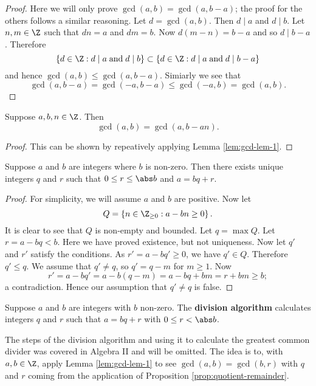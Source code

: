 \begin{proof}
	Here we will only prove $\gcd(a, b) = \gcd(a, b - a)$;
	the proof for the others follows a similar reasoning.
	Let $d = \gcd(a, b)$.
	Then $d \mid a$ and $d \mid b$.
	Let $n, m \in \Z$ such that
	$dn = a$ and $dm = b$.
	Now $d(m - n) = b - a$
	and so $d \mid b - a$.
	Therefore
	\[
		\{ d \in \Z : d \mid a \;\text{and}\; d \mid b \}
		\subset \{ d \in \Z : d \mid a \;\text{and}\; d \mid b - a \}
	\]
	and hence $\gcd(a, b) \leq \gcd(a, b - a)$.
	Simiarly we see that \[
		\gcd(a, b - a)
		=    \gcd(-a, b - a)
		\leq \gcd(-a, b)
		=    \gcd(a,b).
	\]
\end{proof}

\begin{lemma}
	Suppose $a, b, n \in \Z$.
	Then
	\[
		\gcd(a,b) = \gcd(a, b - an).
	\]
\end{lemma}

\begin{proof}
	This can be shown by repeatively applying Lemma \ref{lem:gcd-lem-1}.
\end{proof}

\begin{proposition}[]
	\label{prop:quotient-remainder}
	Suppose $a$ and $b$ are integers where $b$ is non-zero.
	Then there exists unique integers $q$ and $r$ such that
	$0 \leq r \leq \abs b$ and $a = bq + r$.
\end{proposition}

\begin{proof}
	For simplicity, we will assume $a$ and $b$ are positive.
	Now let
	\[
		Q = \left\{ n \in \Z_{\geq 0} : a - bn \geq 0 \right\}.
	\]
	It is clear to see that $Q$ is non-empty and bounded.
	Let $q = \max Q$.
	Let $r = a - bq < b$.
	Here we have proved existence, but not uniqueness.
	Now let $q'$ and $r'$ satisfy the conditions.
	As $r' = a - bq' \geq 0$, we have $q' \in Q$.
	Therefore $q' \leq q$.
	We assume that $q' \neq q$, so $q' = q - m$ for $m \geq 1$.
	Now
	\[
		r' 
		= a - bq' 
		= a - b(q - m)
		= a - bq + bm
		= r + bm
		\geq b;
	\]
	a contradiction.
	Hence our assumption that $q' \neq q$ is false.
\end{proof}

\begin{algorithm}
	Suppose $a$ and $b$ are integers with $b$ non-zero.
	The \textbf{division algorithm} calculates integers $q$ and $r$
	such that $a = bq + r$ with $0 \leq r < \abs b$.
\end{algorithm}

\begin{remark}
	The steps of the division algorithm and using it to calculate the greatest 
	common divider was covered in Algebra II and will be omitted.
	The idea is to, with $a, b \in \Z$, apply Lemma \ref{lem:gcd-lem-1} to see $
		\gcd(a,b) = \gcd(b,r)
	$ with $q$ and $r$ coming from the application of Proposition 
	\ref{prop:quotient-remainder}.
\end{remark}

